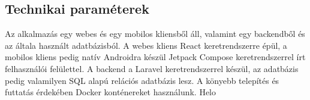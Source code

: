 

\subsection{Technikai paraméterek}

Az alkalmazás egy webes és egy mobilos kliensből áll, valamint egy backendből és az általa használt adatbázisból. A webes kliens  React keretrendszerre épül, a mobilos kliens pedig natív Androidra készül Jetpack Compose keretrendszerrel írt felhasználói felülettel. A backend a Laravel keretrendszerrel készül, az adatbázis pedig valamilyen SQL alapú relációs adatbázis lesz. A könyebb telepítés és futtatás érdekében Docker konténereket használunk.
Helo